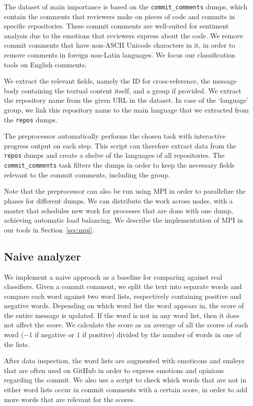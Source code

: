 \documentclass{article}
\begin{document}
The dataset of main importance is based on the {\tt commit\_comments} dumps, 
which contain the comments that reviewers make on pieces of code and commits in 
specific repositories. These commit comments are well-suited for sentiment 
analysis due to the emotions that reviewers express about the code. We remove
commit comments that have non-ASCII Unicode characters in it, in order to
remove comments in foreign non-Latin languages. We focus our classification
tools on English comments.

We extract the relevant fields, namely the ID for cross-reference, the message 
body containing the textual content itself, and a group if provided. We extract 
the repository name from the given URL in the dataset. In case of the 
`language' group, we link this repository name to the main language that we 
extracted from the {\tt repos} dumps.

The preprocessor automatically performs the chosen task with interactive 
progress output on each step. This script can therefore extract data from the
{\tt repos} dumps and create a shelve of the languages of all repositories. The
{\tt commit\_comments} task filters the dumps in order to keep the necessary
fields relevant to the commit comments, including the group.

Note that the preprocessor can also be run using MPI in order to parallelize 
the phases for different dumps. We can distribute the work across nodes, with 
a master that schedules new work for processes that are done with one dump, 
achieving automatic load balancing. We describe the implementation of MPI in 
our tools in Section~\ref{sec:mpi}.

\subsection{Naive analyzer}\label{sec:analyzer}
We implement a naive approach as a baseline for comparing against real 
classifiers. Given a commit comment, we split the text into separate words and 
compare each word against two word lists, respectively containing positive and 
negative words. Depending on which word list the word appears in, the score of 
the entire message is updated. If the word is not in any word list, then it 
does not affect the score. We calculate the score as an average of all the 
scores of each word ($-1$ if negative or $1$ if positive) divided by the number 
of words in one of the lists.

After data inspection, the word lists are augmented with emoticons and smileys 
that are often used on GitHub in order to express emotions and opinions 
regarding the commit. We also use a script to check which words that are not 
in either word lists occur in commit comments with a certain score, in order to 
add more words that are relevant for the scores.
\end{document}
